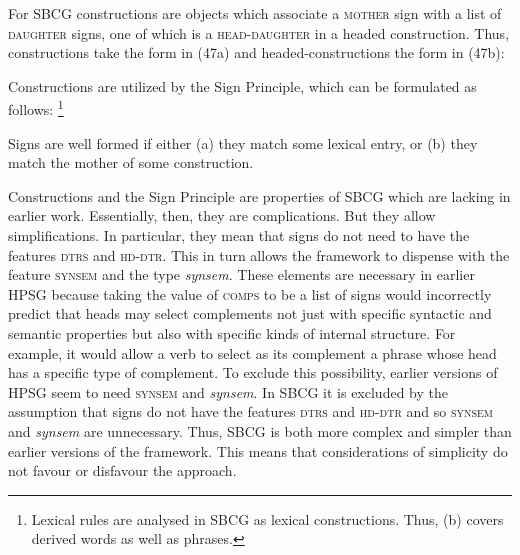 \documentclass[output=paper
	        ,collection
	        ,collectionchapter
 	        ,biblatex
                ,babelshorthands
                ,newtxmath
                ,draftmode
                ,colorlinks, citecolor=brown
]{langscibook}
\begin{document}
For SBCG constructions are objects which associate a \textsc{mother} sign with a list of \textsc{daughter} signs, one of which is a \textsc{head-daughter} in a headed construction. Thus, constructions take the form in (47a) and headed-constructions the form in (47b):

\begin{multicols}{2}
\ea\label{ex:prop48}
	\ea\label{ex:prop48a}
	
\columnbreak
	
	\ex\label{ex:prop48b}
\z
	\z
\end{multicols}

Constructions are utilized by the Sign Principle, which can be formulated as follows:%
%
\footnote{Lexical rules are analysed in SBCG as lexical constructions. Thus, (b) covers derived words as well as phrases.}
%

\ea\label{ex:prop49}
Signs are well formed if either (a) they match some lexical entry, or (b) they match the mother of some construction.
\z

Constructions and the Sign Principle are properties of SBCG which are lacking in earlier work. Essentially, then, they are complications. But they allow simplifications. In particular, they mean that signs do not need to have the features \textsc{dtrs} and \textsc{hd-dtr}. This in turn allows the framework to dispense with the feature \textsc{synsem} and the type \emph{synsem}. These elements are necessary in earlier HPSG because taking the value of \textsc{comps} to be a list of signs would incorrectly predict that heads may select complements not just with specific syntactic and semantic properties but also with specific kinds of internal structure. For example, it would allow a verb to select as its complement a phrase whose head has a specific type of complement. To exclude this possibility, earlier versions of HPSG seem to need \textsc{synsem} and \emph{synsem}. In SBCG it is excluded by the assumption that signs do not have the features \textsc{dtrs} and \textsc{hd-dtr} and so \textsc{synsem} and \emph{synsem} are unnecessary. Thus, SBCG is both more complex and simpler than earlier versions of the framework. This means that considerations of simplicity do not favour or disfavour the approach.
\end{document}
